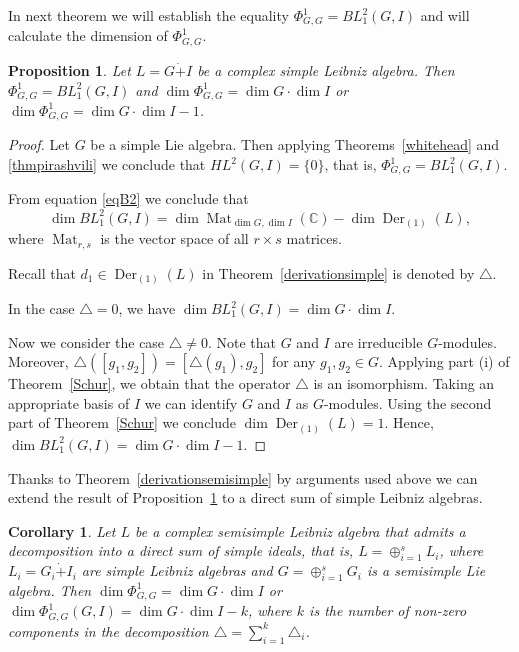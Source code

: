 \documentclass[12pt,reqno]{amsart}
\newtheorem{cor}[thm]{Corollary}
\newtheorem{prop}[thm]{Proposition}
\numberwithin{equation}{section}
\begin{document}
In next theorem we will establish the equality $\Phi_{G,G}^1=BL_{1}^2(G,I)$ and will calculate the dimension of $\Phi_{G,G}^1$.
\begin{prop} \label{prop34}
 Let $L=G\dot{+}I$ be a complex simple Leibniz algebra. Then $\Phi_{G,G}^1=BL_{1}^2(G,I)$ and
 $\dim \Phi_{G,G}^1=\dim G \cdot \dim I$ or $\dim \Phi_{G,G}^1=\dim G \cdot \dim I -1$.
\end{prop}
\begin{proof} Let $G$ be a simple Lie algebra. Then applying Theorems~\ref{whitehead} and \ref{thmpirashvili} we conclude that $HL^2(G,I)=\{0\}$, that is,
 $\Phi_{G,G}^1 = BL^2_{1}(G,I)$.

From equation \eqref{eqB2} we conclude that \[\dim BL_{1}^2(G,I)=\dim \operatorname{Mat}_{\dim G,\dim I}(\mathbb{C}) - \dim \operatorname{Der}_{(1)}(L),\]
where $\operatorname{Mat}_{r,s}$ is the vector space of all $r \times s$ matrices.

Recall that $d_1\in \operatorname{Der}_{(1)}(L)$ in Theorem~\ref{derivationsimple} is denoted by $\triangle$.

In the case $\triangle=0$, we have $\dim BL_{1}^2(G,I)=\dim G \cdot \dim I$.

Now we consider the case $\triangle\neq 0$. Note that $G$ and $I$ are irreducible $G$-modules. Moreover, $\triangle([g_1,g_2])=[\triangle(g_1),g_2]$
 for any $g_1, g_2\in G$. Applying part (i) of Theorem~\ref{Schur}, we obtain that the operator $\triangle$ is an isomorphism. Taking an appropriate basis of $I$
  we can identify $G$ and $I$ as $G$-modules. Using the second part of Theorem~\ref{Schur} we conclude $\dim \operatorname{Der}_{(1)}(L)=1$. Hence, $\dim BL_{1}^2(G,I)=\dim G \cdot \dim I - 1$.

\end{proof}

Thanks to Theorem~\ref{derivationsemisimple} by arguments used above we can extend the result of Proposition~\ref{prop34} to a direct sum of simple Leibniz algebras.

\begin{cor} Let $L$ be a complex semisimple Leibniz algebra that admits a decomposition into a direct sum of simple ideals, that is,
 $L=\oplus_{i=1}^s L_i$, where $L_i=G_i\dot{+}I_i$ are simple Leibniz algebras and $G=\oplus_{i=1}^s G_i$ is a semisimple Lie algebra.
  Then $\dim \Phi_{G,G}^1=\dim G \cdot \dim I$ or $\dim \Phi_{G,G}^1(G,I)=\dim G \cdot \dim I -k$, where
$k$ is the number of non-zero components in  the decomposition $\triangle=\sum_{i=1}^k \triangle_i$.
\end{cor}
\end{document}
